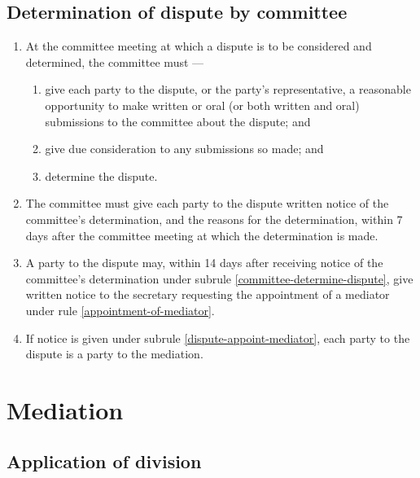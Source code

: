 \documentclass[../constitution.tex]{subfiles}
\begin{document}
\hypertarget{determination-of-dispute-by-committee}{%
  \subsection{Determination of dispute by committee}\label{determination-of-dispute-by-committee}}

\begin{enumerate}

  \item At the committee meeting at which a dispute is to be considered and determined, the committee must ---

        \begin{enumerate}

          \item give each party to the dispute, or the party's representative, a reasonable opportunity to make written or oral (or both written and oral) submissions to the committee about the dispute; and
          \item give due consideration to any submissions so made; and
          \item determine the dispute. \label{committee-determine-dispute}
        \end{enumerate}
  \item The committee must give each party to the dispute written notice of the committee's determination, and the reasons for the determination, within 7 days after the committee meeting at which the determination is made.
  \item A party to the dispute may, within 14 days after receiving notice of the committee's determination under subrule \ref{committee-determine-dispute}, give written notice to the secretary requesting the appointment of a mediator under rule \ref{appointment-of-mediator}. \label{dispute-appoint-mediator}
  \item If notice is given under subrule \ref{dispute-appoint-mediator}, each party to the dispute is a party to the mediation.
\end{enumerate}

\hypertarget{division-4-mediation}{%
  \section{Mediation}\label{division-4-mediation}}

\hypertarget{application-of-division-mediation}{%
  \subsection{Application of division}\label{application-of-division-mediation}}
\end{document}
